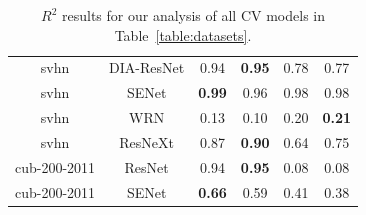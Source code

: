 \begin{table}[t]
\begin{center}
\begin{tabular}{|c|c|c|c|c|c|}
 svhn & DIA-ResNet  & 0.94 &  \textbf{0.95} & 0.78 & 0.77 \\
 svhn & SENet  & \textbf{0.99} &  0.96 & 0.98 & 0.98 \\
 svhn & WRN  & 0.13 &  0.10 & 0.20 & \textbf{0.21} \\
 svhn & ResNeXt  & 0.87 &  \textbf{0.90} & 0.64 & 0.75 \\
\hline
 cub-200-2011 & ResNet  & 0.94 &  \textbf{0.95} & 0.08 & 0.08 \\
 cub-200-2011 & SENet  & \textbf{0.66} &  0.59 & 0.41 & 0.38 \\
\hline
\end{tabular}
\end{center}
\vspace{-5mm}
\caption{$R^{2}$ results for our analysis of all CV models in Table~\ref{table:datasets}. }
\label{table:R2results}
\end{table}


